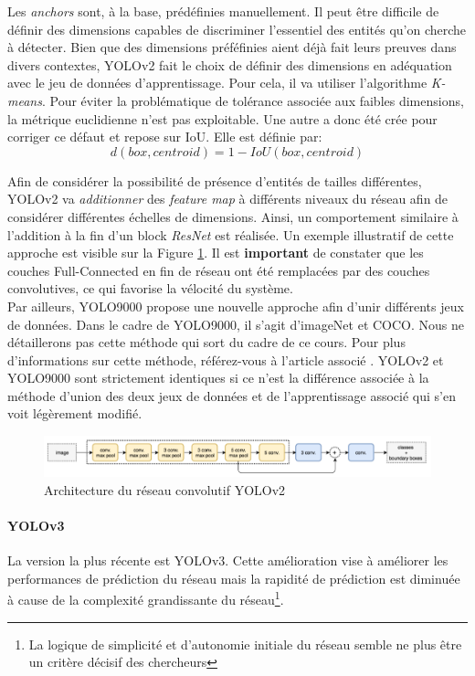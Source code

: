 \noindent Les \textit{anchors} sont, à la base, prédéfinies manuellement. Il peut être difficile de définir des dimensions capables de discriminer l'essentiel des entités qu'on cherche à détecter. Bien que des dimensions préféfinies aient déjà fait leurs preuves dans divers contextes, YOLOv2 fait le choix de définir des dimensions en adéquation avec le jeu de données d'apprentissage. Pour cela, il va utiliser l'algorithme \textit{K-means}\cite{kmeans}. Pour éviter la problématique de tolérance associée aux faibles dimensions, la métrique euclidienne n'est pas exploitable. Une autre a donc été crée pour corriger ce défaut et repose sur IoU. Elle est définie par:
$$d(box, centroid)=1-IoU(box,centroid)$$

\noindent Afin de considérer la possibilité de présence d'entités de tailles différentes, YOLOv2 va \textit{additionner} des \textit{feature map} à différents niveaux du réseau afin de considérer différentes échelles de dimensions. Ainsi, un comportement similaire à l'addition à la fin d'un block \textit{ResNet} est réalisée. Un exemple illustratif de cette approche est visible sur la Figure \ref{yolov2net}. Il est \textbf{important} de constater que les couches Full-Connected  en fin de réseau ont été remplacées par des couches convolutives, ce qui favorise la vélocité du système.\\

\noindent Par ailleurs, YOLO9000 propose une nouvelle approche afin d'unir différents jeux de données. Dans le cadre de YOLO9000, il s'agit d'imageNet et COCO. Nous ne détaillerons pas cette méthode qui sort du cadre de ce cours. Pour plus d'informations sur cette méthode, référez-vous à l'article associé \cite{yolov2_deep}. YOLOv2 et YOLO9000 sont strictement identiques si ce n'est la différence associée à la méthode d'union des deux jeux de données et de l'apprentissage associé qui s'en voit légèrement modifié.

\begin{figure}
\centering
\includegraphics[scale=0.4]{./tex/computer-vision/sota/yolov2net.png}
\caption{Architecture du réseau convolutif YOLOv2}
\label{yolov2net}
\end{figure}

\paragraph{YOLOv3}
La version la plus récente est YOLOv3\cite{yolov3}. Cette amélioration vise à améliorer les performances de prédiction du réseau mais la rapidité de prédiction est diminuée à cause de la complexité grandissante du réseau\footnote{La logique de simplicité et d'autonomie initiale du réseau semble ne plus être un critère décisif des chercheurs}.\\

